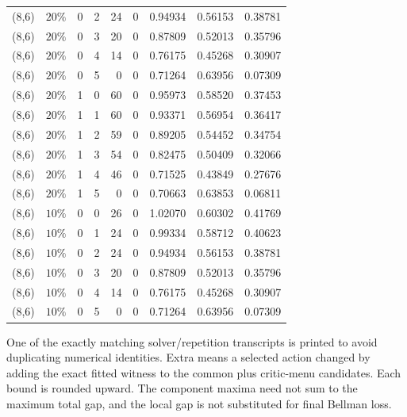 \begin{longtable}{lrrrrrrrr}
(8,6) & $20\%$ & 0 & 2 & 24 & 0 & 0.94934 & 0.56153 & 0.38781 \\
(8,6) & $20\%$ & 0 & 3 & 20 & 0 & 0.87809 & 0.52013 & 0.35796 \\
(8,6) & $20\%$ & 0 & 4 & 14 & 0 & 0.76175 & 0.45268 & 0.30907 \\
(8,6) & $20\%$ & 0 & 5 & 0 & 0 & 0.71264 & 0.63956 & 0.07309 \\
(8,6) & $20\%$ & 1 & 0 & 60 & 0 & 0.95973 & 0.58520 & 0.37453 \\
(8,6) & $20\%$ & 1 & 1 & 60 & 0 & 0.93371 & 0.56954 & 0.36417 \\
(8,6) & $20\%$ & 1 & 2 & 59 & 0 & 0.89205 & 0.54452 & 0.34754 \\
(8,6) & $20\%$ & 1 & 3 & 54 & 0 & 0.82475 & 0.50409 & 0.32066 \\
(8,6) & $20\%$ & 1 & 4 & 46 & 0 & 0.71525 & 0.43849 & 0.27676 \\
(8,6) & $20\%$ & 1 & 5 & 0 & 0 & 0.70663 & 0.63853 & 0.06811 \\
(8,6) & $10\%$ & 0 & 0 & 26 & 0 & 1.02070 & 0.60302 & 0.41769 \\
(8,6) & $10\%$ & 0 & 1 & 24 & 0 & 0.99334 & 0.58712 & 0.40623 \\
(8,6) & $10\%$ & 0 & 2 & 24 & 0 & 0.94934 & 0.56153 & 0.38781 \\
(8,6) & $10\%$ & 0 & 3 & 20 & 0 & 0.87809 & 0.52013 & 0.35796 \\
(8,6) & $10\%$ & 0 & 4 & 14 & 0 & 0.76175 & 0.45268 & 0.30907 \\
(8,6) & $10\%$ & 0 & 5 & 0 & 0 & 0.71264 & 0.63956 & 0.07309 \\
\hline\end{longtable}
\noindent One of the exactly matching solver/repetition transcripts is printed to avoid duplicating numerical identities. Extra means a selected action changed by adding the exact fitted witness to the common plus critic-menu candidates. Each bound is rounded upward. The component maxima need not sum to the maximum total gap, and the local gap is not substituted for final Bellman loss.
\endgroup

